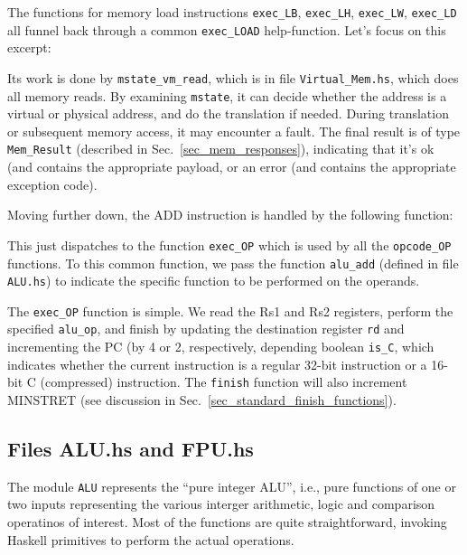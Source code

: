 \documentclass[11pt]{article}
\begin{document}
The functions for memory load instructions \verb|exec_LB|,
\verb|exec_LH|, \verb|exec_LW|, \verb|exec_LD| all funnel back through
a common \verb|exec_LOAD| help-function.  Let's focus on this excerpt:



Its work is done by \verb|mstate_vm_read|, which is in file
\verb|Virtual_Mem.hs|, which does all memory reads.  By examining
\verb|mstate|, it can decide whether the address is a virtual or
physical address, and do the translation if needed.  During
translation or subsequent memory access, it may encounter a fault.
The final result is of type \verb|Mem_Result| (described in
Sec.~\ref{sec_mem_responses}), indicating that it's ok (and contains
the appropriate payload, or an error (and contains the appropriate
exception code).

Moving further down, the ADD instruction is handled by the following
function:



This just dispatches to the function \verb|exec_OP| which is used by
all the \verb|opcode_OP| functions.  To this common function, we pass
the function \verb|alu_add| (defined in file \verb|ALU.hs|) to
indicate the specific function to be performed on the operands.

The \verb|exec_OP| function is simple.  We read the Rs1 and Rs2
registers, perform the specified \verb|alu_op|, and finish by updating
the destination register \verb|rd| and incrementing the PC (by 4 or 2,
respectively, depending boolean \verb|is_C|, which indicates whether
the current instruction is a regular 32-bit instruction or a 16-bit C
(compressed) instruction.  The \verb|finish| function will also
increment MINSTRET (see discussion in
Sec.~\ref{sec_standard_finish_functions}).




\subsection{Files ALU.hs and FPU.hs}

The module \verb|ALU| represents the ``pure integer ALU'', i.e., pure
functions of one or two inputs representing the various interger
arithmetic, logic and comparison operatinos of interest.  Most of the
functions are quite straightforward, invoking Haskell primitives to
perform the actual operations.
\end{document}
